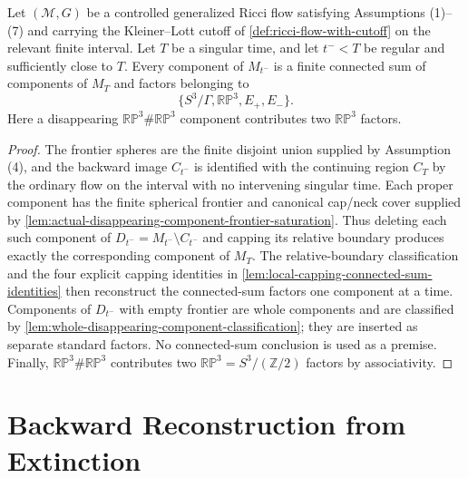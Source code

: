 \begin{lemma}
\label{lem:single-surgery-connected-sum-reconstruction}
\notready
Let $({\mathcal M},G)$ be a controlled generalized Ricci flow satisfying
Assumptions (1)--(7) and carrying the Kleiner--Lott cutoff of
\ref{def:ricci-flow-with-cutoff} on the relevant finite interval.  Let $T$ be a
singular time, and let $t^-<T$ be regular and sufficiently close to $T$.
Every component of $M_{t^-}$ is a finite connected sum of components of $M_T$
and factors
belonging to
\[
 \{S^3/\Gamma,\mathbb{RP}^3,E_+,E_-\}.
\]
Here a disappearing $\mathbb{RP}^3\#\mathbb{RP}^3$ component contributes two
$\mathbb{RP}^3$ factors.
\end{lemma}

\begin{proof}
  The frontier spheres are the finite disjoint union supplied by Assumption (4),
and the backward image $C_{t^-}$ is identified with the continuing region
$C_T$ by the ordinary flow on the interval with no intervening singular time.
  Each proper component has the finite spherical frontier and canonical
  cap/neck cover supplied by
  \ref{lem:actual-disappearing-component-frontier-saturation}.  Thus deleting each such component of
$D_{t^-}=M_{t^-}\setminus C_{t^-}$ and capping its relative boundary produces
exactly the corresponding component of $M_T$.  The relative-boundary
classification and the four explicit capping identities in
\ref{lem:local-capping-connected-sum-identities} then reconstruct the
connected-sum factors one component at a time.  Components of $D_{t^-}$ with
empty frontier are whole components and are classified by
\ref{lem:whole-disappearing-component-classification}; they are inserted as
separate standard factors.  No connected-sum conclusion is used as a premise.
Finally, $\mathbb{RP}^3\#\mathbb{RP}^3$ contributes two
$\mathbb{RP}^3=S^3/(\mathbb Z/2)$ factors by associativity.
\end{proof}

\section{Backward Reconstruction from Extinction}


